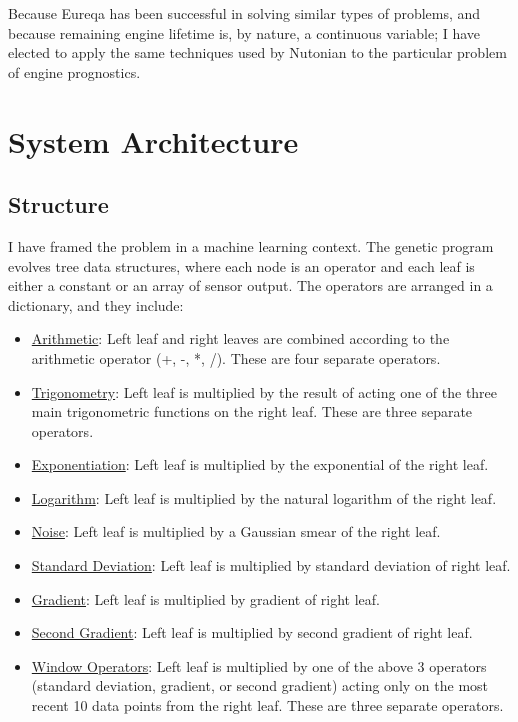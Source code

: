 \documentclass{acm_proc_article-sp}
\begin{document}
Because Eureqa has been successful in solving similar types of problems, and because remaining engine lifetime is, by nature, a continuous variable; I have elected to apply the same techniques used by Nutonian to the particular problem of engine prognostics.

\section{System Architecture}
\subsection{Structure}
I have framed the problem in a machine learning context. The genetic program evolves tree data structures, where each node is an operator and each leaf is either a constant or an array of sensor output. The operators are arranged in a dictionary, and they include:

\begin{itemize}
\item {\underline{Arithmetic}}: Left leaf and right leaves are combined according to the arithmetic operator (+, -, *, /). These are four separate operators.
\item {\underline{Trigonometry}}: Left leaf is multiplied by the result of acting one of the three main trigonometric functions on the right leaf. These are three separate operators.
\item {\underline{Exponentiation}}: Left leaf is multiplied by the exponential of the right leaf.
\item {\underline{Logarithm}}: Left leaf is multiplied by the natural logarithm of the right leaf.
\item {\underline{Noise}}: Left leaf is multiplied by a Gaussian smear of the right leaf.
\item {\underline{Standard Deviation}}: Left leaf is multiplied by standard deviation of right leaf.
\item {\underline{Gradient}}: Left leaf is multiplied by gradient of right leaf.
\item {\underline{Second Gradient}}: Left leaf is multiplied by second gradient of right leaf.
\item {\underline{Window Operators}}: Left leaf is multiplied by one of the above 3 operators (standard deviation, gradient, or second gradient) acting only on the most recent 10 data points from the right leaf. These are three separate operators.
\end{itemize}
\end{document}
